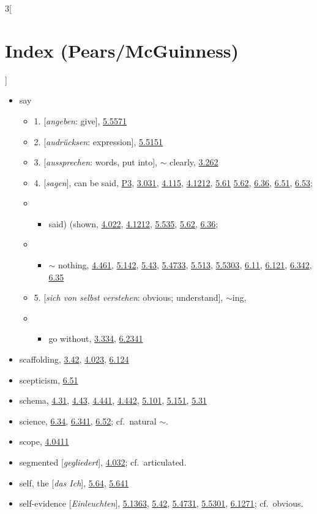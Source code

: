 \documentclass[oneside,openany,12pt]{book}
\newcommand{\indexentry}[1]{\item #1}
\newcommand{\indexsubentry}[1]{\begin{itemize} \item #1 \end{itemize}}
\newcommand{\indexsubsubentry}[1]{\begin{itemize} \item \begin{itemize} \item #1 \end{itemize} \end{itemize}}
\newcommand{\indexref}[1]{\hyperlink{prop#1}{#1}}
\newcommand{\indexgap}{\bigskip}
\begin{document}
\begin{multicols}{3}[\section*{Index (Pears/McGuinness)}]
\begin{itemize}
\indexgap

\indexentry{say}

   \indexsubentry{1. [\textit{angeben}: give], \indexref{5.5571}}

   \indexsubentry{2. [\textit{audr{\"u}cksen}: expression], \indexref{5.5151}}

   \indexsubentry{3. [\textit{aussprechen}: words, put into], $\sim$ clearly, \indexref{3.262}}

   \indexsubentry{4. [\textit{sagen}], can be said, \hyperlink{pref3}{P3}, \indexref{3.031}, \indexref{4.115}, \indexref{4.1212}, \indexref{5.61} \indexref{5.62}, \indexref{6.36}, \indexref{6.51}, \indexref{6.53};}

   \indexsubsubentry{said) (shown, \indexref{4.022}, \indexref{4.1212}, \indexref{5.535}, \indexref{5.62}, \indexref{6.36};}

   \indexsubsubentry{$\sim$ nothing, \indexref{4.461}, \indexref{5.142}, \indexref{5.43}, \indexref{5.4733}, \indexref{5.513}, \indexref{5.5303}, \indexref{6.11}, \indexref{6.121}, \indexref{6.342}, \indexref{6.35}}

   \indexsubentry{5. [\textit{sich von selbst verstehen}: obvious; understand], $\sim$ing,}

   \indexsubsubentry{go without, \indexref{3.334}, \indexref{6.2341}}

\indexentry{scaffolding, \indexref{3.42}, \indexref{4.023}, \indexref{6.124}}

\indexentry{scepticism, \indexref{6.51}}

\indexentry{schema, \indexref{4.31}, \indexref{4.43}, \indexref{4.441}, \indexref{4.442}, \indexref{5.101}, \indexref{5.151}, \indexref{5.31}}

\indexentry{science, \indexref{6.34}, \indexref{6.341}, \indexref{6.52}; cf.\ natural $\sim$.}

\indexentry{scope, \indexref{4.0411}}

\indexentry{segmented [\textit{gegliedert}], \indexref{4.032}; cf.\ articulated.}

\indexentry{self, the [\textit{das Ich}], \indexref{5.64}, \indexref{5.641}}

\indexentry{self-evidence [\textit{Einleuchten}], \indexref{5.1363}, \indexref{5.42}, \indexref{5.4731}, \indexref{5.5301}, \indexref{6.1271}; cf.\ obvious.}


\end{itemize}
\end{multicols}
\end{document}
